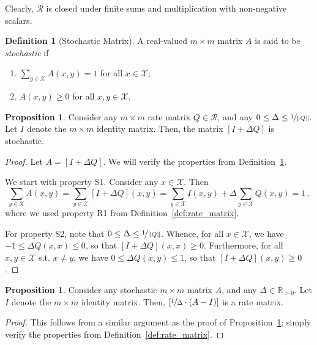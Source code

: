 \documentclass[10pt]{paper}
\theoremstyle{definition}
\newtheorem{proposition}[theorem]{Proposition}
\newtheorem{definition}{Definition}
\newcommand{\reals}{\mathbb{R}}
\newcommand{\realspos}{\reals_{>0}}
\newcommand{\states}{\mathcal{X}}
\newcommand{\norm}[1]{\left\lVert #1 \right\rVert}
\begin{document}
Clearly, $\mathcal{R}$ is closed under finite sums and multiplication with non-negative scalars. 

\begin{definition}[Stochastic Matrix]\label{def:stoch_matrix}
A real-valued $m\times m$ matrix $A$ is said to be \emph{stochastic} if
\vspace{5pt}
\begin{enumerate}[label=S\arabic*:]
\item
$\sum_{y\in\states}A(x,y)=1$ for all $x\in\states$;
\item
$A(x,y)\geq0$ for all $x,y\in\states$.
\end{enumerate}
\vspace{5pt}
\noindent
\end{definition}

\begin{proposition}\label{prop:stochastic_from_rate_matrix}
Consider any $m\times m$ rate matrix $Q\in\mathcal{R}$, and any $0\leq \Delta \leq \nicefrac{1}{\norm{Q}}$. Let $I$ denote the $m\times m$ identity matrix. Then, the matrix $[I+\Delta Q]$ is stochastic.
\end{proposition}
\begin{proof}
Let $A=[I+\Delta Q]$. We will verify the properties from Definition~\ref{def:stoch_matrix}.

We start with property S1. Consider any $x\in\states$. Then
\begin{equation*}
\sum_{y\in\states} A(x,y) = \sum_{y\in\states} [I + \Delta Q](x,y) = \sum_{y\in\states}I(x,y) + \Delta \sum_{y\in\states}Q(x,y) = 1\,,
\end{equation*}
where we used property R1 from Definition~\ref{def:rate_matrix}.

For property S2, note that $0\leq \Delta \leq \nicefrac{1}{\norm{Q}}$. Whence, for all $x\in\states$, we have $-1\leq \Delta Q(x,x) \leq 0$, so that $[I+\Delta Q](x,x) \geq 0$. Furthermore, for all $x,y\in\states$ s.t. $x\neq y$, we have $0\leq \Delta Q(x,y) \leq 1$, so that $[I+\Delta Q](x,y)\geq 0$.
\end{proof}

\begin{proposition}\label{prop:rate_from_stochastic_matrix}
Consider any stochastic $m\times m$ matrix $A$, and any $\Delta\in\realspos$. Let $I$ denote the $m\times m$ identity matrix. Then, $[\nicefrac{1}{\Delta}\cdot(A-I)]$ is a rate matrix.
\end{proposition}
\begin{proof}
This follows from a similar argument as the proof of Proposition~\ref{prop:stochastic_from_rate_matrix}; simply verify the properties from Definition~\ref{def:rate_matrix}.
\end{proof}
\end{document}

